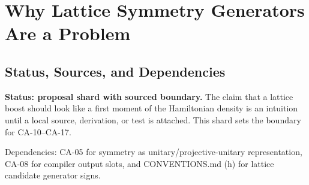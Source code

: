 
\section{Why Lattice Symmetry Generators Are a Problem}
\label{sec:lattice-symmetry-motivation}

\subsection{Status, Sources, and Dependencies}

\textbf{Status: proposal shard with sourced boundary.}  The claim that a
lattice boost should look like a first moment of the Hamiltonian density is an
intuition until a local source, derivation, or test is attached.  This shard
sets the boundary for CA-10--CA-17.

Dependencies: CA-05 for symmetry as unitary/projective-unitary representation,
CA-08 for compiler output slots, and CONVENTIONS.md (h) for lattice candidate
generator signs.


